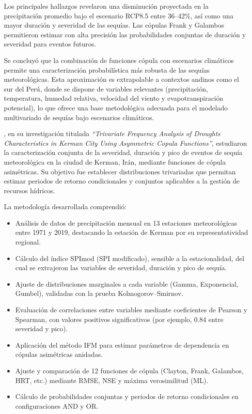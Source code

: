 Los principales hallazgos revelaron una disminución proyectada en la precipitación promedio bajo el escenario RCP8.5 entre 36–42\%, así como una mayor duración y severidad de las sequías. Las cópulas Frank y Galambos permitieron estimar con alta precisión las probabilidades conjuntas de duración y severidad para eventos futuros.

Se concluyó que la combinación de funciones cópula con escenarios climáticos permite una caracterización probabilística más robusta de las sequías meteorológicas. Esta aproximación es extrapolable a contextos andinos como el sur del Perú, donde se dispone de variables relevantes (precipitación, temperatura, humedad relativa, velocidad del viento y evapotranspiración potencial), lo que ofrece una base metodológica adecuada para el modelado multivariado de sequías bajo escenarios climáticos.



\textcite{Eskandaripour2025}, en su investigación titulada \textit{“Trivariate Frequency Analysis of Droughts Characteristics in Kerman City Using Asymmetric Copula Functions”}, estudiaron la caracterización conjunta de la severidad, duración y pico de eventos de sequía meteorológica en la ciudad de Kerman, Irán, mediante funciones de cópula asimétricas. Su objetivo fue establecer distribuciones trivariadas que permitan estimar periodos de retorno condicionales y conjuntos aplicables a la gestión de recursos hídricos.

La metodología desarrollada comprendió:
\begin{itemize}
    \item Análisis de datos de precipitación mensual en 13 estaciones meteorológicas entre 1971 y 2019, destacando la estación de Kerman por su representatividad regional.
    \item Cálculo del índice SPImod (SPI modificado), sensible a la estacionalidad, del cual se extrajeron las variables de severidad, duración y pico de sequía.
    \item Ajuste de distribuciones marginales a cada variable (Gamma, Exponencial, Gumbel), validadas con la prueba Kolmogorov–Smirnov.
    \item Evaluación de correlaciones entre variables mediante coeficientes de Pearson y Spearman, con valores positivos significativos (por ejemplo, 0.84 entre severidad y pico).
    \item Aplicación del método IFM para estimar parámetros de dependencia en cópulas asimétricas anidadas.
    \item Ajuste y comparación de 12 funciones de cópula (Clayton, Frank, Galambos, HRT, etc.) mediante RMSE, NSE y máxima verosimilitud (ML).
    \item Cálculo de probabilidades conjuntas y periodos de retorno condicionales en configuraciones AND y OR.
\end{itemize}

